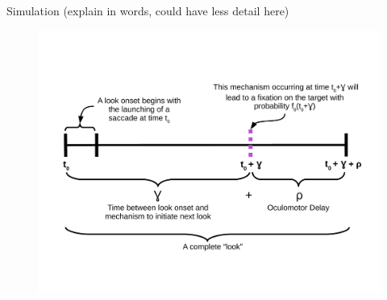\documentclass{beamer}
\providecommand{\cn}[1]{\textcolor{blue}{#1}}
\begin{document}
%
%
%
%
%
%

\begin{frame}{Simulation (explain in words, could have less detail here)}

\vspace{-2.5mm}
\begin{figure}
\centering
\includegraphics[scale=0.4]{look_comp.pdf}
\end{figure}
\end{frame}
\end{document}
